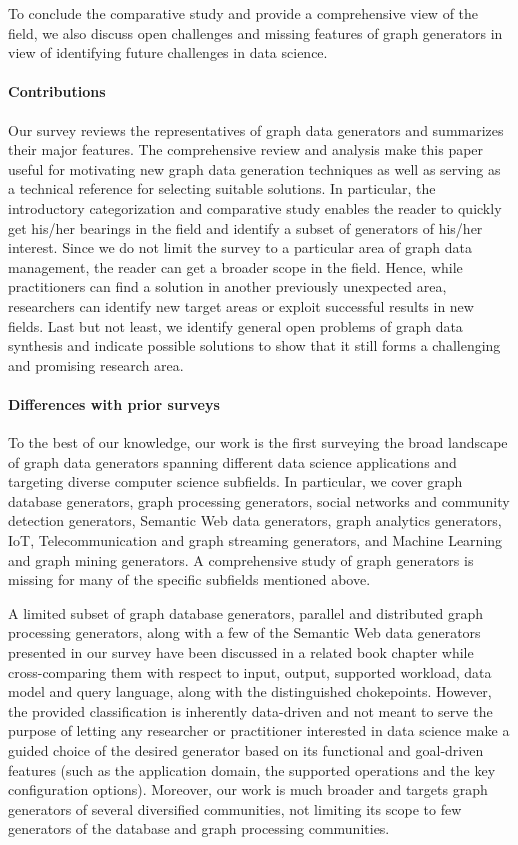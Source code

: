 To conclude the comparative study and provide a comprehensive view of the field,  we also discuss open challenges and missing features of graph generators in view of identifying future challenges in data science.


\paragraph*{Contributions} Our survey reviews the representatives of graph data generators and summarizes their major features. The comprehensive review and analysis make this paper useful for motivating new graph data generation techniques as well as serving as a technical reference for selecting suitable solutions. In particular, the introductory categorization and comparative study enables the reader to quickly get his/her bearings in the field and identify a subset of generators of his/her interest. Since we do not limit the survey to a particular area of graph data management,  the reader can get a broader scope in the field. Hence, while practitioners can find a solution in another previously unexpected area, researchers can identify new target areas or exploit successful results in new fields. Last but not least, we identify general open problems of graph data synthesis and indicate possible solutions to show that it still forms a challenging and promising research area.

\paragraph*{Differences with prior surveys}

To the best of our knowledge, our work is the first surveying the broad
landscape of graph data generators spanning different data science applications and
targeting diverse computer science subfields. In particular, we cover graph database
generators, graph processing generators, social networks and community detection
generators, Semantic Web data generators, graph
analytics generators, IoT, Telecommunication and graph streaming generators,
and Machine Learning and graph mining generators. A comprehensive study of
graph generators is missing for many of the specific subfields mentioned
above.

A limited subset of graph database
generators, parallel and distributed graph processing generators, along
with a few of the Semantic Web data generators presented in our survey have
been discussed in a related book chapter
\cite{BFHI18} while cross-comparing them with respect to input, output,
supported workload, data model and query language, along with the
distinguished chokepoints. However, the provided classification is
inherently data-driven and not meant to serve the purpose of letting any
researcher or practitioner interested in data science make a guided
choice of the desired
generator based on its functional and goal-driven features (such as the application domain,
the supported operations and the key configuration options).
Moreover, our work is much broader and targets graph generators of several
diversified communities, not limiting its scope to few generators of the database
and graph processing communities.

